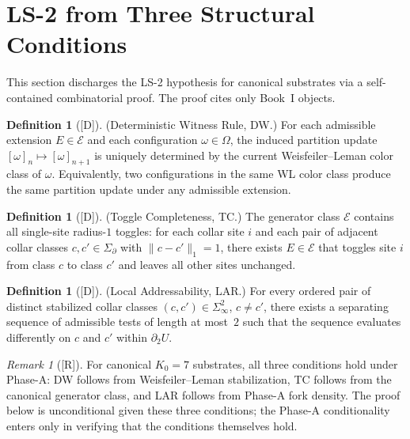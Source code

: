 \documentclass[12pt,oneside]{amsbook}
\theoremstyle{plain}
\theoremstyle{definition}
\newtheorem{definition}[theorem]{Definition}
\theoremstyle{remark}
\newtheorem{remark}[theorem]{Remark}
\newcommand{\status}[1]{\textup{[#1]}}
\begin{document}
\section{LS-2 from Three Structural Conditions}
\label{sec:ls2-derived}

This section discharges the LS-2 hypothesis for canonical substrates
via a self-contained combinatorial proof.  The proof cites only
Book~I objects.

\begin{definition}[\status{D}]\label{def:DW}
\textup{(Deterministic Witness Rule, DW.)}  For each admissible
extension $E \in \mathcal{E}$ and each configuration $\omega \in
\Omega$, the induced partition update $[{\omega}]_n \mapsto
[{\omega}]_{n+1}$ is uniquely determined by the current
Weisfeiler--Leman color class of $\omega$.  Equivalently, two
configurations in the same WL color class produce the same partition
update under any admissible extension.
\end{definition}

\begin{definition}[\status{D}]\label{def:TC}
\textup{(Toggle Completeness, TC.)}  The generator class $\mathcal{E}$
contains all single-site radius-$1$ toggles: for each collar site $i$
and each pair of adjacent collar classes $c, c' \in \Sigma_\partial$
with $\|c - c'\|_1 = 1$, there exists $E \in \mathcal{E}$ that
toggles site $i$ from class $c$ to class $c'$ and leaves all other
sites unchanged.
\end{definition}

\begin{definition}[\status{D}]\label{def:LAR}
\textup{(Local Addressability, LAR.)}  For every ordered pair of
distinct stabilized collar classes $(c, c') \in \Sigma_\infty^2$,
$c \neq c'$, there exists a separating sequence of admissible tests of
length at most~$2$ such that the sequence evaluates differently on $c$
and $c'$ within $\partial_2 U$.
\end{definition}

\begin{remark}[\status{R}]\label{rmk:conditions-hold}
For canonical $K_0 = 7$ substrates, all three conditions hold under
Phase-A: DW follows from Weisfeiler--Leman stabilization, TC follows
from the canonical generator class, and LAR follows from Phase-A fork
density.  The proof below is unconditional given these three
conditions; the Phase-A conditionality enters only in verifying that
the conditions themselves hold.
\end{remark}
\end{document}
